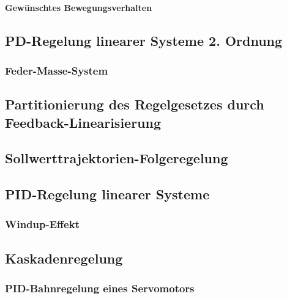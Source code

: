 \documentclass[a4paper, 11pt, accentcolor = tud3b]{tudreport}
\begin{document}
					\paragraph{Gewünschtes Bewegungsverhalten} %

			\subsection{PD-Regelung linearer Systeme 2. Ordnung} %

				\subsubsection{Feder-Masse-System} %

			\subsection{Partitionierung des Regelgesetzes durch Feedback-Linearisierung} %

			\subsection{Sollwerttrajektorien-Folgeregelung} %

			\subsection{PID-Regelung linearer Systeme} %

				\subsubsection{Windup-Effekt} %

			\subsection{Kaskadenregelung} %

				\subsubsection{PID-Bahnregelung eines Servomotors} %
\end{document}
